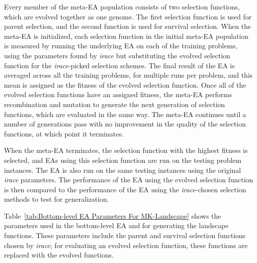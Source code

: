 \documentclass[sigconf]{acmart}
\begin{document}
Every member of the meta-EA population consists of two selection functions, which are evolved together as one genome. The first selection function is used for parent selection, and the second function is used for survival selection. When the meta-EA is initialized, each selection function in the initial meta-EA population is measured by running the underlying EA on each of the training problems, using the parameters found by \textit{irace} but substituting the evolved selection function for the \textit{irace}-picked selection schemes. The final result of the EA is averaged across all the training problems, for multiple runs per problem, and this mean is assigned as the fitness of the evolved selection function. Once all of the evolved selection functions have an assigned fitness, the meta-EA performs recombination and mutation to generate the next generation of selection functions, which are evaluated in the same way. The meta-EA continues until a number of generations pass with no improvement in the quality of the selection functions, at which point it terminates.

When the meta-EA terminates, the selection function with the highest fitness is selected, and EAs using this selection function are run on the testing problem instances. The EA is also run on the same testing instances using the original \textit{irace} parameters. The performance of the EA using the evolved selection function is then compared to the performance of the EA using the \textit{irace}-chosen selection methods to test for generalization.

Table~\ref{tab:Bottom-level EA Parameters For MK-Landscape} shows the parameters used in the bottom-level EA and for generating the landscape functions. These parameters include the parent and survival selection functions chosen by \textit{irace}; for evaluating an evolved selection function, these functions are replaced with the evolved functions.
\end{document}
